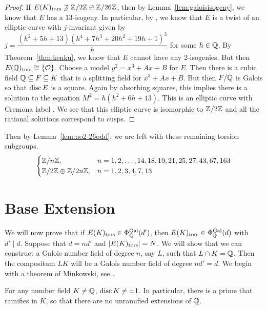 \begin{proof}
If $E(K)_{\text{tors}} \not\supseteq \mathbb{Z}/2\mathbb{Z} \oplus \mathbb{Z}/26\mathbb{Z}$, then by Lemma~\ref{lem:galoisisogeny}, we know that $E$ has a 13-isogeny. In particular, by \cite[Table~3]{lozanorobledo13}, we know that $E$ is a twist of an elliptic curve with $j$-invariant given by $j= \dfrac{(h^2 + 5h + 13)(h^4 + 7h^3 + 20h^2 + 19h + 1)^3}{h}$ for some $h \in \mathbb{Q}$. By Theorem~\ref{thm:kenku}, we know that $E$ cannot have any 2-isogenies. But then $E(\mathbb{Q})_{\text{tors}} \cong \{ \mathcal{O} \}$. Choose a model $y^2= x^3 + Ax + B$ for $E$. Then there is a cubic field $\mathbb{Q} \subseteq F \subseteq K$ that is a splitting field for $x^3 + Ax + B$. But then $F/\mathbb{Q}$ is Galois so that $\operatorname{disc} E$ is a square. Again by absorbing squares, this implies there is a solution to the equation $M^2= h(h^2 + 6h + 13)$. This is an elliptic curve with Cremona label \ftat{}. We see that this elliptic curve is isomorphic to $\mathbb{Z}/2\mathbb{Z}$ and all the rational solutions correspond to cusps. 
\end{proof}


Then by Lemma~\ref{lem:no2-26odd}, we are left with these remaining torsion subgroups. 
	\[
	\begin{cases}
	\mathbb{Z}/n\mathbb{Z}, & n= 1, 2, \ldots, 14, 18, 19, 21, 25, 27, 43, 67, 163 \\
	\mathbb{Z}/2\mathbb{Z} \oplus \mathbb{Z}/2n\mathbb{Z}, & n= 1, 2, 3, 4, 7, 13
	\end{cases}
	\]





\section{Base Extension}

We will now prove that if $E(K)_{\text{tors}} \in \Phi_{\mathbb{Q}}^{\operatorname{Gal}}(d')$, then $E(K)_{\text{tors}} \in \Phi_{\mathbb{Q}}^{\operatorname{Gal}}(d)$ with $d' \mid d$. Suppose that $d= nd'$ and $|E(K)_{\text{tors}}|= N$. We will show that we can construct a Galois number field of degree $n$, say $L$, such that $L \cap K= \mathbb{Q}$. Then the compositum $LK$ will be a Galois number field of degree $nd'= d$. We begin with a theorem of Minkowski, see \cite[Thm.~2.17]{neukirch}. 


\begin{thm}[Minkowski] \label{thm:minkowski}
For any number field $K \neq \mathbb{Q}$, $\operatorname{disc} K \neq \pm 1$. In particular, there is a prime that ramifies in $K$, so that there are no unramified extensions of $\mathbb{Q}$. 
\end{thm}


